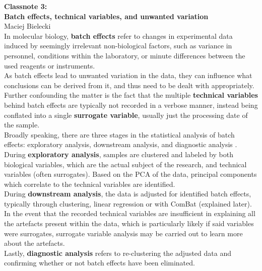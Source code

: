 \documentclass[12pt]{article}
\begin{document}
\renewcommand{\H}[1]{\Large\textbf{#1}\\[2mm]\normalsize}
\newcommand{\h}[1]{\large\textbf{#1}\\[2mm]\normalsize}
\newcommand{\n}{\\[6mm]}
\renewcommand{\b}[1]{\textbf{#1}}
\renewcommand{\i}[1]{\textit{#1}}

\raggedright

\H{Classnote 3:\\Batch effects, technical variables, and unwanted variation}
Maciej Bielecki\\[12mm]


In molecular biology, \b{batch effects} refer to changes in experimental data
induced by seemingly irrelevant non-biological factors, such as variance in
personnel, conditions within the laboratory, or minute differences between the
used reagents or instruments.
\n

As batch effects lead to unwanted variation in the data, they can influence
what conclusions can be derived from it, and thus need to be dealt with 
appropriately. Further confounding the matter is the fact that the multiple 
\b{technical variables} behind batch effects are typically not recorded in a
verbose manner, instead being conflated into a single \b{surrogate variable},
usually just the processing date of the sample.
\n

Broadly speaking, there are three stages in the statistical
analysis of batch effects: exploratory analysis, downstream analysis,
and diagnostic analysis \cite{leek10}.
\n

During \b{exploratory analysis}, samples are clustered and labeled by both 
biological variables, which are the actual subject of the research, and
technical variables (often surrogates). Based on the PCA of the data,
principal components which correlate to the technical variables are identified.
\n

During \b{downstream analysis}, the data is adjusted for identified batch
effects, typically through clustering, linear regression or with ComBat
(explained later). In the event that the recorded technical variables are
insufficient in explaining all the artefacts present within the data, which is
particularly likely if said variables were surrogates, surrogate variable
analysis may be carried out to learn more about the artefacts.
\n

Lastly, \b{diagnostic analysis} refers to re-clustering the adjusted data and
confirming whether or not batch effects have been eliminated.
\n
\end{document}
